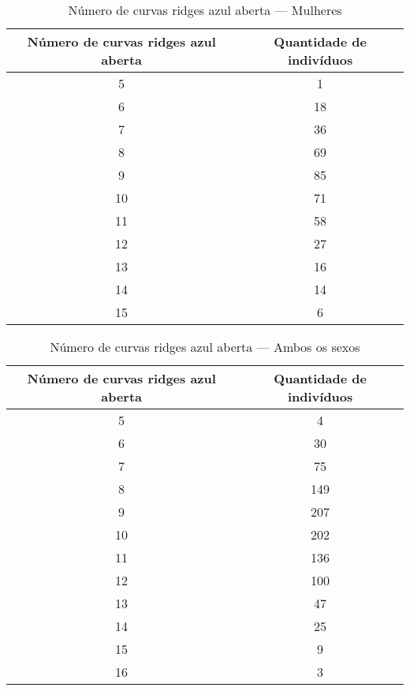 \documentclass[a4paper,12pt]{article}
\begin{document}
\begin{table}[h!]
\centering
\caption{Número de curvas ridges azul aberta — Mulheres}
\begin{tabular}{c c}
\hline
\textbf{Número de curvas ridges azul aberta} & \textbf{Quantidade de indivíduos} \\ 
\hline
5  & 1   \\
6  & 18  \\
7  & 36  \\
8  & 69  \\
9  & 85  \\
10 & 71  \\
11 & 58  \\
12 & 27  \\
13 & 16  \\
14 & 14  \\
15 & 6   \\
\hline
\end{tabular}
\end{table}


\begin{table}[h!]
\centering
\caption{Número de curvas ridges azul aberta — Ambos os sexos}
\begin{tabular}{c c}
\hline
\textbf{Número de curvas ridges azul aberta} & \textbf{Quantidade de indivíduos} \\ 
\hline
5  & 4    \\
6  & 30   \\
7  & 75   \\
8  & 149  \\
9  & 207  \\
10 & 202  \\
11 & 136  \\
12 & 100  \\
13 & 47   \\
14 & 25   \\
15 & 9    \\
16 & 3    \\
\hline
\end{tabular}
\end{table}
\end{document}
